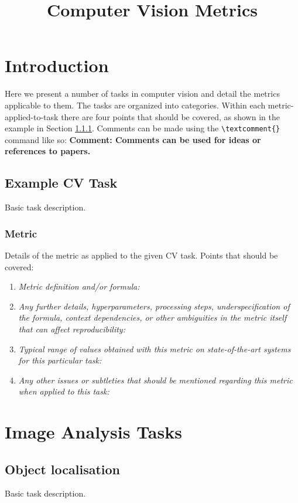 \documentclass[a4paper,11pt]{article}
\title{Computer Vision Metrics}
\author{}
\date{}
\newcommand{\textcomment}[1]{{{\bf \color{Aquamarine} Comment: #1}}}
\begin{document}
\maketitle

\section{Introduction}
Here we present a number of tasks in computer vision and detail the metrics applicable to them. The tasks are organized into categories. Within each metric-applied-to-task there are four points that should be covered, as shown in the example in Section \ref{example_metric_applied_to_task}. Comments can be made using the \verb+\textcomment{}+ command like so: \textcomment{Comments can be used for ideas or references to papers.}

\subsection{Example CV Task} \label{example_cv_task}
    Basic task description. 
    \subsubsection{Metric} \label{example_metric_applied_to_task}
    Details of the metric as applied to the given CV task. Points that should be covered:
    \begin{enumerate}[label=\alph*.]
        \item \textit{Metric definition and/or formula:}
            \bigskip
            \item \textit{Any further details, hyperparameters, processing steps, underspecification of the formula, context dependencies, or other ambiguities in the metric itself that can affect reproducibility:}
            \bigskip
            \item \textit{Typical range of values obtained with this metric on state-of-the-art systems for this particular task:}
            \bigskip
            \item \textit{Any other issues or subtleties that should be mentioned regarding this metric when applied to this task:}
            \bigskip
    \end{enumerate}


\section{Image Analysis Tasks}
    \subsection{Object localisation}
    Basic task description. 
\end{document}
